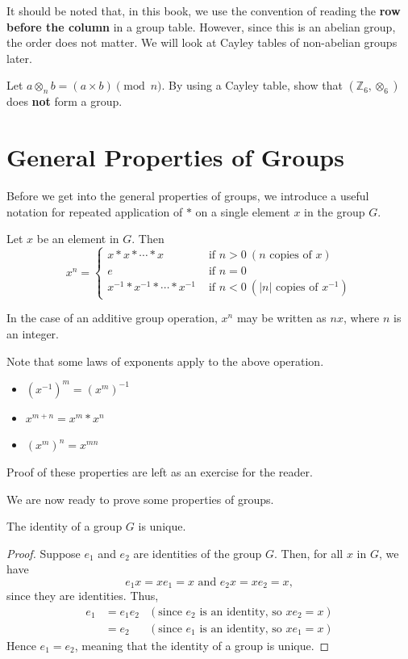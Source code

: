 It should be noted that, in this book, we use the convention of reading the \textbf{row before the column} in a group table. However, since this is an abelian group, the order does not matter. We will look at Cayley tables of non-abelian groups later.

\begin{exercise}
    Let $a \otimes_n b = (a \times b) \pmod{n}$. By using a Cayley table, show that $(\mathbb{Z}_6, \otimes_6)$ does \textbf{not} form a group.
\end{exercise}

\section{General Properties of Groups}
Before we get into the general properties of groups, we introduce a useful notation for repeated application of $\ast$ on a single element $x$ in the group $G$.
\begin{definition}
    Let $x$ be an element in $G$. Then
    \[
        x^n =
        \begin{cases}
            x\ast x\ast \cdots \ast x & \text{ if } n > 0 \ (n\text{ copies of }x)\\
            e & \text{ if } n=0 \\
            x^{-1}\ast x^{-1}\ast \cdots \ast x^{-1} & \text{ if } n<0 \ (|n|\text{ copies of }x^{-1})
        \end{cases}
    \]
\end{definition}
\begin{remark}
    In the case of an additive group operation, $x^n$ may be written as $nx$, where $n$ is an integer.
\end{remark}

Note that some laws of exponents apply to the above operation.
\begin{itemize}
    \item $\left(x^{-1}\right)^m = \left(x^m\right)^{-1}$
    \item $x^{m+n} = x^m \ast x^n$
    \item $\left(x^m\right)^n = x^{mn}$
\end{itemize}
Proof of these properties are left as an exercise for the reader.

We are now ready to prove some properties of groups.
\begin{proposition}\label{prop-identity-is-unique}
    The identity of a group $G$ is unique.
\end{proposition}
\begin{proof}
    Suppose $e_1$ and $e_2$ are identities of the group $G$. Then, for all $x$ in $G$, we have
    \[
        e_1x = xe_1 = x \text{ and } e_2x = xe_2 = x,
    \]
    since they are identities. Thus,
    \begin{align*}
        e_1 &= e_1e_2 & (\text{since } e_2 \text{ is an identity, so } xe_2 = x)\\
        &= e_2 & (\text{since } e_1 \text{ is an identity, so } xe_1 = x)
    \end{align*}
    Hence $e_1 = e_2$, meaning that the identity of a group is unique.
\end{proof}

